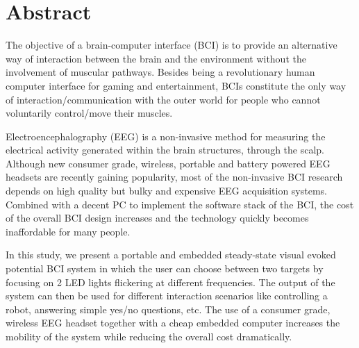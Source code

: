 \documentclass[12pt]{article}
\numberwithin{equation}{section}
\numberwithin{figure}{section}
\numberwithin{table}{section}
\begin{document}
\renewcommand\listfigurename{\normalsize\bfseries List of Figures}
\thispagestyle{empty}
\vspace*{0.15cm}
\listoffigures
\clearpage

\renewcommand\listtablename{\normalsize\bfseries List of Tables}
\thispagestyle{empty}
\vspace*{0.15cm}
\listoftables
\clearpage

\vspace*{-0.35cm}
\thispagestyle{empty}
\section*{Abstract}
\vspace*{6pt}

\par{
    The objective of a brain-computer interface (BCI) is to provide an alternative way of interaction between the brain and the environment
    without the involvement of muscular pathways. Besides being a revolutionary human computer interface for gaming and entertainment,
    BCIs constitute the only way of interaction/communication with the outer world for people who cannot voluntarily control/move their muscles.
}
\par{
    Electroencephalography (EEG) is a non-invasive method for measuring the electrical activity generated within the brain structures, through the scalp.
    Although new consumer grade, wireless, portable and battery powered EEG headsets are recently gaining popularity,
    most of the non-invasive BCI research depends on high quality but bulky and expensive EEG acquisition systems.
    Combined with a decent PC to implement the software stack of the BCI, the cost of the overall
    BCI design increases and the technology quickly becomes inaffordable for many people.
}
\par{
    In this study, we present a portable and embedded steady-state visual evoked potential BCI
    system in which the user can choose between two targets by focusing on 2 LED lights flickering
    at different frequencies. The output of the system can then be used for different
    interaction scenarios like controlling a robot, answering simple yes/no questions, etc.
    The use of a consumer grade, wireless EEG headset together with a cheap embedded computer
    increases the mobility of the system while reducing the overall cost dramatically.
}
\end{document}
